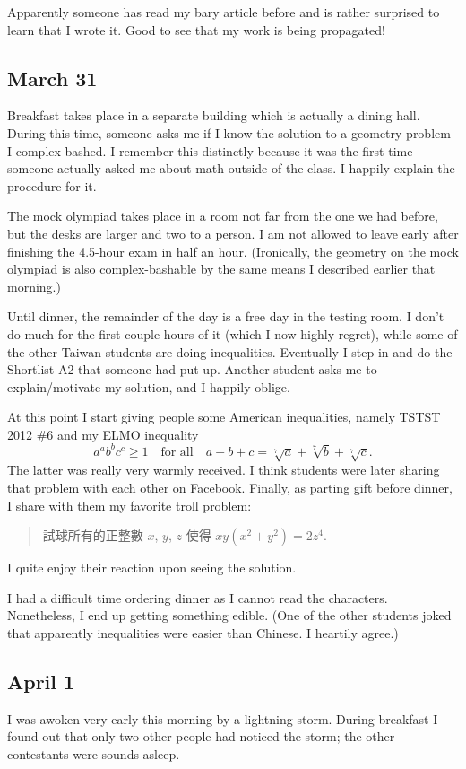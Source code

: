 \documentclass[11pt]{scrreprt}
\begin{document}
Apparently someone has read my bary article before and is rather surprised to learn that I wrote it. Good to see that my work is being propagated!

\subsection{March 31}
Breakfast takes place in a separate building which is actually a dining hall. During this time, someone asks me if I know the solution to a geometry problem I complex-bashed. I remember this distinctly because it was the first time someone actually asked me about math outside of the class. I happily explain the procedure for it.

The mock olympiad takes place in a room not far from the one we had before, but the desks are larger and two to a person. I am not allowed to leave early after finishing the 4.5-hour exam in half an hour.
(Ironically, the geometry on the mock olympiad is also complex-bashable by the same means I described earlier that morning.)

Until dinner, the remainder of the day is a free day in the testing room. I don't do much for the first couple hours of it (which I now highly regret), while some of the other Taiwan students are doing inequalities.
Eventually I step in and do the Shortlist A2 that someone had put up. Another student asks me to explain/motivate my solution, and I happily oblige.

At this point I start giving people some American inequalities, namely TSTST 2012 \#6 and my ELMO inequality
\[ a^a b^b c^c \ge 1 \quad \text{for all} \quad a+b+c = \sqrt[7]{a} + \sqrt[7]{b} + \sqrt[7]{c}. \]
The latter was really very warmly received. I think students were later sharing that problem with each other on Facebook. Finally, as parting gift before dinner, I share with them my favorite troll problem:
\begin{quote}
  試球所有的正整數 $x$, $y$, $z$ 使得 $xy(x^2+y^2)=2z^4$.
\end{quote}
I quite enjoy their reaction upon seeing the solution.

I had a difficult time ordering dinner as I cannot read the characters. Nonetheless, I end up getting something edible. (One of the other students joked that apparently inequalities were easier than Chinese. I heartily agree.)

\subsection{April 1}
I was awoken very early this morning by a lightning storm. During breakfast I found out that only two other people had noticed the storm; the other contestants were sounds asleep.
\end{document}
